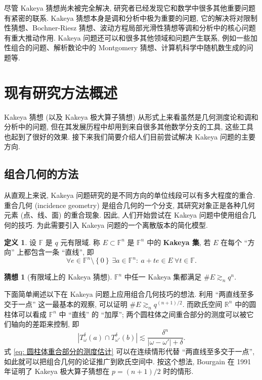 \documentclass[a4paper]{article}
\numberwithin{equation}{section}
\numberwithin{figure}{section}
\numberwithin{table}{section}
\theoremstyle{definition}
\newtheorem{conjecture}[theorem]{\indent 猜想}
\newtheorem*{definition}{\indent 定义}
\newcommand{\abs}[1]{\left\lvert #1 \right\rvert}
\newcommand{\set}[1]{\left\{ #1 \right\}}
\newcommand{\mb}[1]{\mathbb{#1}}
\newcommand{\sm}{\setminus}
\newcommand{\ls}{\lesssim}
\newcommand{\gs}{\gtrsim}
\newcommand{\R}{\mathbb{R}}
\newcommand{\F}{\mathbb{F}}
\begin{document}
尽管 Kakeya 猜想尚未被完全解决, 研究者已经发现它和数学中很多其他重要问题有紧密的联系. Kakeya 猜想本身是调和分析中极为重要的问题, 它的解决将对限制性猜想、Bochner-Riesz 猜想、波动方程局部光滑性猜想等调和分析中的核心问题有重大推动作用\cite{tao2001rotating,bourga1991besicovitch}. Kakeya 问题还可以和很多其他领域和问题产生联系, 例如一些加性组合的问题\cite{laba2008harmonic}、解析数论中的 Montgomery 猜想\cite{bourgain1993distribution}、计算机科学中随机数生成的问题\cite{dvir2011kakeya}等.

\section{现有研究方法概述}

Kakeya 猜想 (以及 Kakeya 极大算子猜想) 从形式上来看虽然是几何测度论和调和分析中的问题, 但在其发展历程中却用到来自很多其他数学分支的工具, 这些工具也起到了很好的效果. 接下来我们简要介绍人们目前尝试解决 Kakeya 问题的主要方向.

\subsection{组合几何的方法}

从直观上来说, Kakeya 问题研究的是不同方向的单位线段可以有多大程度的重合. 重合几何 (incidence geometry) 是组合几何的一个分支, 其研究对象正是各种几何元素 (点、线、面) 的重合现象. 因此, 人们开始尝试在 Kakeya 问题中使用组合几何的技巧.\cite{wolff1999recent} 为此需要引入 Kakeya 问题的一个离散版本的简化模型. 

\begin{definition}
    设 $\mb{F}$ 是 $q$ 元有限域. 称 $E\subset\mb{F}^n$ 是 $\F^n$ 中的 \textbf{Kakeya 集}, 若 $E$ 在每个 ``方向'' 上都包含一条 ``直线'', 即
    \[
        \forall e\in\mb{F}^n\sm\set{0}\ \exists a\in\mb{F}^n:\ a+te\in E\ \forall t\in\mb{F}.
    \]
\end{definition}

\begin{conjecture}[有限域上的 Kakeya 猜想]
    \label{conj: 有限域}
    $\F^n$ 中任一 Kakeya 集都满足 $\# E\gs_n q^n$.
\end{conjecture}

下面简单阐述以下在 Kakeya 问题上应用组合几何技巧的想法. 利用 ``两直线至多交于一点'' 这一最基本的观察, 可以证明 $\# E\gs_n q^{(n+1)/2}$. 而欧氏空间 $\R^n$ 中的圆柱体可以看成 $\F^n$ 中 ``直线'' 的 ``加厚''; 两个圆柱体之间重合部分的测度可以被它们轴向的差距来控制, 即
\begin{equation}
    \label{eq: 圆柱体重合部分的测度估计}
    \abs{T_\omega^\delta(a)\cap T_{\omega'}^\delta(b)}\ls\frac{\delta^n}{\abs{\omega-\omega'}+\delta}.
\end{equation}
式 \eqref{eq: 圆柱体重合部分的测度估计} 可以在连续情形代替 ``两直线至多交于一点'', 如此就可以把组合几何的论证推广到欧氏空间中. 按这个想法, Bourgain 在 1991 年证明了 Kakeya 极大算子猜想在 $p=(n+1)/2$ 时的情形\cite{bourga1991besicovitch}. 
\end{document}
